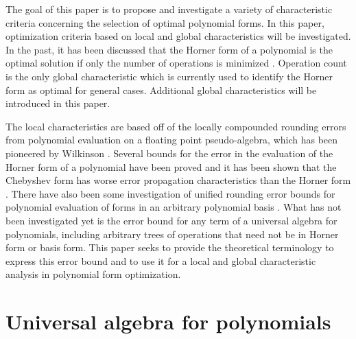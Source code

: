 \documentclass[]{elsarticle}
\begin{document}
The goal of this paper is to propose and investigate a variety of characteristic criteria concerning the selection of optimal polynomial forms.
In this paper, optimization criteria based on local and global characteristics will be investigated.
In the past, it has been discussed that the Horner form of a polynomial is the optimal solution if only the number of operations is minimized \cite{borodin}.
Operation count is the only global characteristic which is currently used to identify the Horner form as optimal for general cases.
Additional global characteristics will be introduced in this paper.

The local characteristics are based off of the locally compounded rounding errors from polynomial evaluation on a floating point pseudo-algebra, which has been pioneered by Wilkinson \cite{wilkinson}.
Several bounds for the error in the evaluation of the Horner form of a polynomial have been proved \cite{muller}\cite{rump-bunger-jeannerod} and it has been shown that the Chebyshev form has worse error propagation characteristics than the Horner form \cite{newbery}\cite{oliver}.
There have also been some investigation of unified rounding error bounds for polynomial evaluation of forms in an arbitrary polynomial basis \cite{barrio}.
What has not been investigated yet is the error bound for any term of a universal algebra for polynomials, including arbitrary trees of operations that need not be in Horner form or basis form.
This paper seeks to provide the theoretical terminology to express this error bound and to use it for a local and global characteristic analysis in polynomial form optimization.

\section{Universal algebra for polynomials}
\end{document}
